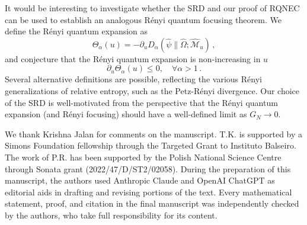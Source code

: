 \documentclass[11pt,a4paper]{article}
\theoremstyle{plain}
\numberwithin{theorem}{section}
\theoremstyle{definition}
\newcommand{\del}{\partial}
\newcommand{\wh}[1]{\widehat{#1}}
\newcommand{\?}{\overset{?}{=}}
\renewcommand{\a}{\alpha}	%
\newcommand{\W}{\Omega}
\newcommand{\cM}{\mathcal{M}}
\begin{document}
It would be interesting to investigate whether the SRD and our proof of RQNEC can be used to establish an analogous R\'enyi quantum focusing theorem.  We define the R\'enyi quantum expansion as
\begin{equation}
    \Theta_\a(u) = -\del_u D_\a(\hat\psi\|\hat\W;\wh{\cM}_u)\,,
\end{equation}
and conjecture that the R\'enyi quantum expansion is non-increasing in $u$
\begin{equation}
    \del_u\Theta_\a(u)\leq 0,\quad \forall \a>1\,.
\end{equation} 
Several alternative definitions are possible, reflecting the various R\'enyi generalizations of relative entropy, such as the Petz-R\'enyi divergence. Our choice of the SRD is well-motivated from the perspective that the R\'enyi quantum expansion (and R\'enyi focusing) should have a well-defined limit as $G_N\to0$.


\begin{acknowledgments}
We thank Krishna Jalan for comments on the manuscript.
T.K. is supported by a Simons Foundation fellowship through the Targeted Grant to Instituto Balseiro. The work of P.R. has been supported by the Polish National Science Centre through Sonata grant (2022/47/D/ST2/02058). 
During the preparation of this manuscript, the authors used Anthropic Claude and OpenAI ChatGPT as editorial aids in drafting and revising portions of the text. Every mathematical statement, proof, and citation in the final manuscript was independently checked by the authors, who take full responsibility for its content.
\end{acknowledgments}
\end{document}
